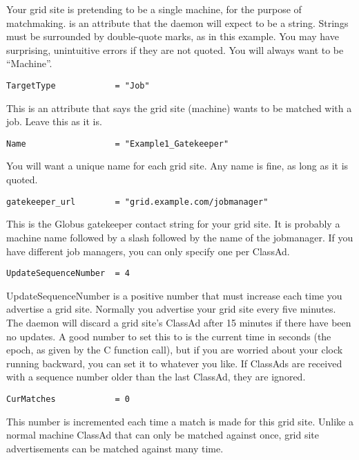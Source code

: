 Your grid site is pretending to be a single machine, for the purpose
of matchmaking.  is an attribute that the 
daemon
will expect to be a string. Strings must be surrounded by double-quote
marks, as in this example. You may have surprising, unintuitive errors
if they are not quoted. You will always want  to be
``Machine''. 

\begin{verbatim}
TargetType            = "Job"
\end{verbatim}

This is an attribute that says the grid site (machine) wants to be
matched with a job. Leave this as it is. 


\footnotesize
\begin{verbatim}
Name                  = "Example1_Gatekeeper"
\end{verbatim}
\normalsize

You will want a unique name for each grid site. Any name is fine, as long as
it is quoted.

\footnotesize
\begin{verbatim}
gatekeeper_url        = "grid.example.com/jobmanager"
\end{verbatim}
\normalsize

This is the Globus gatekeeper contact string for your grid site. It is
probably a machine name followed by a slash followed by the name of
the jobmanager. If you have different job managers, you can only
specify one per ClassAd. 

\begin{verbatim}
UpdateSequenceNumber  = 4
\end{verbatim}

UpdateSequenceNumber is a positive number that must increase each time
you advertise a grid site. Normally you advertise your grid site
every five minutes. The  daemon will discard a grid site's
ClassAd after 15 minutes if there have been no updates. A good number
to set this to is the current time in seconds (the epoch, as given by
the C  function call), but if you are worried about your clock
running backward, you can set it to whatever you like. If ClassAds are
received with a sequence number older than the last ClassAd, they are
ignored. 

\begin{verbatim}
CurMatches            = 0
\end{verbatim}

This number is incremented each time a match is made for this grid
site. Unlike a normal machine ClassAd that can only be matched against
once, grid site advertisements can be matched against many time. 

